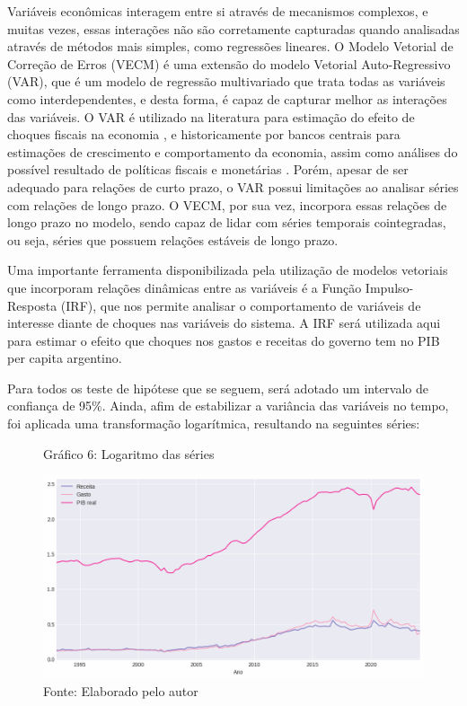 \documentclass[a4paper, 12pt, openany, oneside, brazil]{abntex2}
\begin{document}
Variáveis econômicas interagem entre si através de mecanismos complexos, e muitas vezes, essas interações não são corretamente capturadas quando analisadas através de métodos mais simples, como regressões lineares. O Modelo Vetorial de Correção de Erros (VECM) é uma extensão do modelo Vetorial Auto-Regressivo (VAR), que é um modelo de regressão multivariado que trata todas as variáveis como interdependentes, e desta forma, é capaz de capturar melhor as interações das variáveis. O VAR é utilizado na literatura para estimação do efeito de choques fiscais na economia \cite{Blanchard2002}, e historicamente por bancos centrais para estimações de crescimento e comportamento da economia, assim como análises do possível resultado de políticas fiscais e monetárias \cite{bcb_relatorio_inflacao_2010}. Porém, apesar de ser adequado para relações de curto prazo, o VAR possui limitações ao analisar séries com relações de longo prazo. O VECM, por sua vez, incorpora essas relações de longo prazo no modelo, sendo capaz de lidar com séries temporais cointegradas, ou seja, séries que possuem relações estáveis de longo prazo.

Uma importante ferramenta disponibilizada pela utilização de modelos vetoriais que incorporam relações dinâmicas entre as variáveis é a Função Impulso-Resposta (IRF), que nos permite analisar o comportamento de variáveis de interesse diante de choques nas variáveis do sistema. A IRF será utilizada aqui para estimar o efeito que choques nos gastos e receitas do governo tem no PIB per capita argentino.

Para todos os teste de hipótese que se seguem, será adotado um intervalo de confiança de 95\%.
Ainda, afim de estabilizar a variância das variáveis no tempo, foi aplicada uma transformação logarítmica, resultando na seguintes séries:

\begin{figure}[!htb]
	\caption*{Gráfico 6: Logaritmo das séries}
	\includegraphics[width=.799\textwidth]{metodologia/logaritmo}
	\caption*{Fonte: Elaborado pelo autor}
\end{figure}
\end{document}
